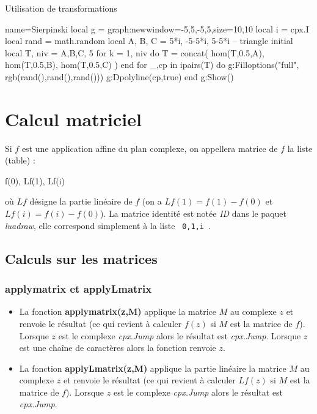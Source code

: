 \begin{demo}{Utilisation de transformations}
\begin{luadraw}{name=Sierpinski}
local g = graph:new{window={-5,5,-5,5},size={10,10}}
local i = cpx.I
local rand = math.random
local A, B, C = 5*i, -5-5*i, 5-5*i -- triangle initial
local T, niv = {{A,B,C}}, 5
for k = 1, niv do
    T = concat( hom(T,0.5,A), hom(T,0.5,B), hom(T,0.5,C) )
end
for _,cp in ipairs(T) do
    g:Filloptions("full", rgb(rand(),rand(),rand()))
    g:Dpolyline(cp,true)
end
g:Show()
\end{luadraw}
\end{demo}

\section{Calcul matriciel}

Si $f$ est une application affine du plan complexe, on appellera matrice de $f$ la liste (table) :
\begin{Luacode}
{ f(0), Lf(1), Lf(i) }
\end{Luacode}
où $Lf$ désigne la partie linéaire de $f$ (on a $Lf(1) = f(1)-f(0)$ et $Lf(i)=f(i)-f(0)$). La matrice identité est notée \emph{ID} dans le paquet \emph{luadraw}, elle correspond simplement à la liste \texttt{ {0,1,i} }.

\subsection{Calculs sur les matrices}

\subsubsection{applymatrix et applyLmatrix}
\begin{itemize}
    \item La fonction \textbf{applymatrix(z,M)} applique la matrice $M$ au complexe $z$ et renvoie le résultat (ce qui revient à calculer $f(z)$ si $M$ est la matrice de $f$). Lorsque $z$ est le complexe \emph{cpx.Jump} alors le résultat est \emph{cpx.Jump}. Lorsque $z$ est une chaîne de caractères alors la fonction renvoie $z$.
    \item La fonction \textbf{applyLmatrix(z,M)} applique la partie linéaire la matrice $M$ au complexe $z$ et renvoie le résultat (ce qui revient à calculer $Lf(z)$ si $M$ est la matrice de $f$). Lorsque $z$ est le complexe \emph{cpx.Jump} alors le résultat est \emph{cpx.Jump}.
\end{itemize}

